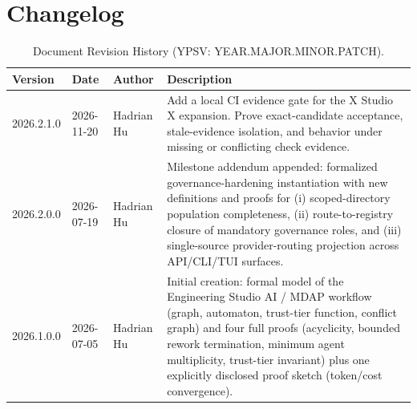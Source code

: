\documentclass[12pt]{article}
\theoremstyle{definition}
\begin{document}
\section*{Changelog}
\label{sec:changelog}

\begin{table}[H]
\centering
\caption{Document Revision History (YPSV: YEAR.MAJOR.MINOR.PATCH).}
\begin{tabular}{@{}lllp{6.5cm}@{}}
\toprule
\textbf{Version} & \textbf{Date} & \textbf{Author} & \textbf{Description} \\
\midrule
2026.2.1.0 & 2026-11-20 & Hadrian Hu & Add a local CI evidence gate
for the X Studio X expansion. Prove exact-candidate acceptance,
stale-evidence isolation, and behavior under missing or conflicting
check evidence. \\
2026.2.0.0 & 2026-07-19 & Hadrian Hu & Milestone addendum appended:
formalized governance-hardening instantiation with new definitions and
proofs for (i) scoped-directory population completeness, (ii)
route-to-registry closure of mandatory governance roles, and (iii)
single-source provider-routing projection across API/CLI/TUI surfaces. \\
2026.1.0.0 & 2026-07-05 & Hadrian Hu & Initial creation: formal model of the
Engineering Studio AI / MDAP workflow (graph, automaton, trust-tier
function, conflict graph) and four full proofs (acyclicity, bounded
rework termination, minimum agent multiplicity, trust-tier invariant) plus
one explicitly disclosed proof sketch (token/cost convergence). \\
\bottomrule
\end{tabular}
\end{table}
\end{document}
